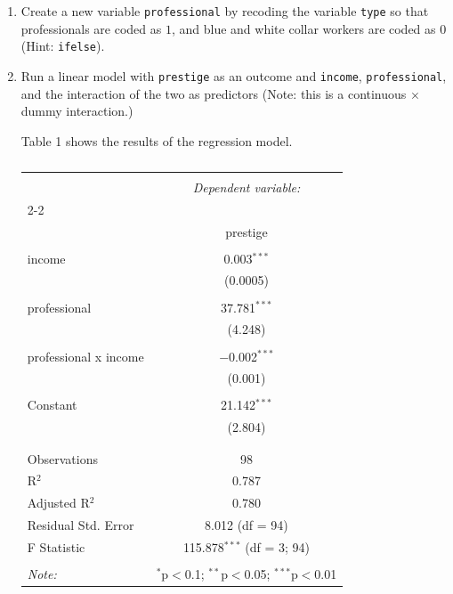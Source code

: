 \documentclass[12pt,letterpaper]{article}
\begin{document}
\newpage
\begin{enumerate}
	
	\item [(a)]
	Create a new variable \texttt{professional} by recoding the variable \texttt{type} so that professionals are coded as $1$, and blue and white collar workers are coded as $0$ (Hint: \texttt{ifelse}).
	
	\vspace{.5cm}
	
	
	\item [(b)]
	Run a linear model with \texttt{prestige} as an outcome and \texttt{income}, \texttt{professional}, and the interaction of the two as predictors (Note: this is a continuous $\times$ dummy interaction.)
	
	\vspace{.5cm}
	
	
	Table 1 shows the results of the regression model. 
	\begin{table}[!htbp] \centering 
		\caption{} 
		\label{} 
		\begin{tabular}{@{\extracolsep{5pt}}lc} 
			\\[-1.8ex]\hline 
			\hline \\[-1.8ex] 
			& \multicolumn{1}{c}{\textit{Dependent variable:}} \\ 
			\cline{2-2} 
			\\[-1.8ex] & prestige \\ 
			\hline \\[-1.8ex] 
			income & 0.003$^{***}$ \\ 
			& (0.0005) \\ 
			& \\ 
			professional & 37.781$^{***}$ \\ 
			& (4.248) \\ 
			& \\ 
			professional x income & $-$0.002$^{***}$ \\ 
			& (0.001) \\ 
			& \\ 
			Constant & 21.142$^{***}$ \\ 
			& (2.804) \\ 
			& \\ 
			\hline \\[-1.8ex] 
			Observations & 98 \\ 
			R$^{2}$ & 0.787 \\ 
			Adjusted R$^{2}$ & 0.780 \\ 
			Residual Std. Error & 8.012 (df = 94) \\ 
			F Statistic & 115.878$^{***}$ (df = 3; 94) \\ 
			\hline 
			\hline \\[-1.8ex] 
			\textit{Note:}  & \multicolumn{1}{r}{$^{*}$p$<$0.1; $^{**}$p$<$0.05; $^{***}$p$<$0.01} \\ 
		\end{tabular} 
	\end{table} 
	

\end{enumerate}
\end{document}
